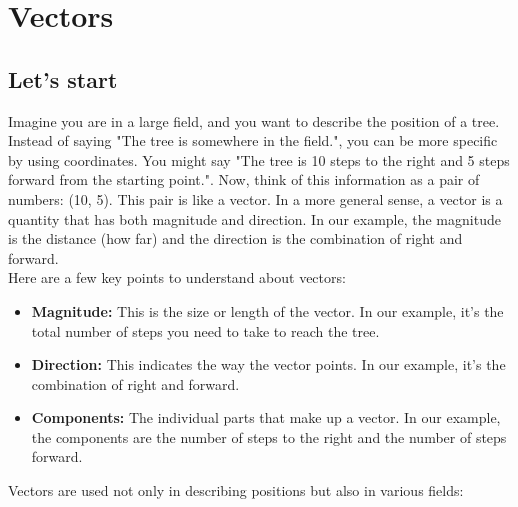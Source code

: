 \iffalse
\chapter{Vectors}
\section{Let's start}
Imagine you are in a large field, and you want to describe the position of a tree. Instead of saying "The tree is somewhere in the field.", you can be more specific by using coordinates. You might say "The tree is 10 steps to the right and 5 steps forward from the starting point.".
Now, think of this information as a pair of numbers: (10, 5). This pair is like a vector. In a more general sense, a vector is a quantity that has both magnitude and direction. In our example, the magnitude is the distance (how far) and the direction is the combination of right and forward.
\\

Here are a few key points to understand about vectors:
\begin{itemize}
    \item \textbf{Magnitude:} This is the size or length of the vector. In our example, it's the total number of steps you need to take to reach the tree.

    \item \textbf{Direction:} This indicates the way the vector points. In our example, it's the combination of right and forward.

    \item \textbf{Components:} The individual parts that make up a vector. In our example, the components are the number of steps to the right and the number of steps forward.
\end{itemize}
Vectors are used not only in describing positions but also in various fields:

